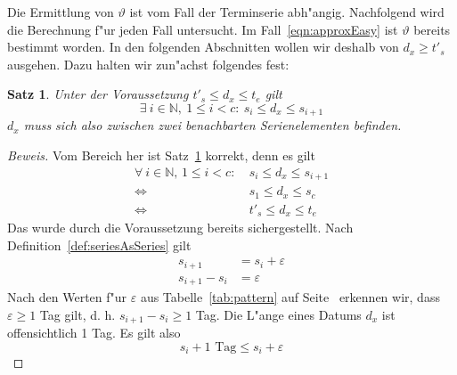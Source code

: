 \documentclass[a4paper]{article}
\numberwithin{equation}{section}
\newtheorem{thm}{Satz}
\begin{document}
\noindent Die Ermittlung von $\vartheta$ ist vom Fall der Terminserie abh"angig.
Nachfolgend wird die Berechnung f"ur jeden Fall untersucht. Im
Fall~\eqref{eqn:approxEasy} ist $\vartheta$ bereits bestimmt worden. In den
folgenden Abschnitten wollen wir deshalb von $d_x \ge t'_s$ ausgehen. Dazu
halten wir zun"achst folgendes fest:
\begin{thm}\label{thm:dBetweenElems}
  Unter der Voraussetzung $t'_s \le d_x \le t_e$ gilt
  \begin{equation}
    \exists\ i \in \mathbb{N},\ 1 \le i < c :\ s_i \le d_x \le s_{i+1}
  \end{equation}
  $d_x$ muss sich also zwischen zwei benachbarten Serienelementen befinden.
\end{thm}
\begin{proof}[Beweis]
  Vom Bereich her ist Satz~\ref{thm:dBetweenElems} korrekt, denn es gilt
  \begin{equation}
  \begin{split}
    \forall\ i \in \mathbb{N},\,1 \le i < c : & \ s_i \le d_x \le s_{i+1} \\
    \Longleftrightarrow & \ s_1 \le d_x \le s_c \\
    \Longleftrightarrow & \ t'_s \le d_x \le t_e
  \end{split}
  \end{equation}
  Das wurde durch die Voraussetzung bereits sichergestellt. Nach
  Definition~\ref{def:seriesAsSeries} gilt
  \begin{equation}
  \begin{split}
    s_{i+1} & = s_i + \varepsilon \\
    s_{i+1} - s_i & = \varepsilon
  \end{split}
  \end{equation}
  Nach den Werten f"ur $\varepsilon$ aus Tabelle~\ref{tab:pattern} auf
  Seite~\pageref{tab:pattern} erkennen wir, dass $\varepsilon \ge 1$ Tag gilt,
  d. h. $s_{i+1} - s_i \ge 1$ Tag. Die L"ange eines Datums $d_x$ ist
  offensichtlich 1 Tag. Es gilt also
  \begin{equation}s_i + 1 \textrm{ Tag} \le s_i + \varepsilon\end{equation}
\end{proof}


%
%
\end{document}
